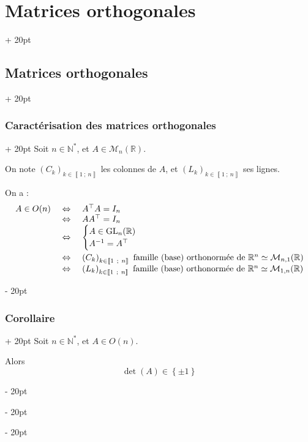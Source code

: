 \documentclass[a4paper, 12pt, twoside]{article}
\newcommand{\N}{\mathbb{N}} %
\newcommand{\R}{\mathbb{R}} %
\newcommand{\nset}[2]{\left\llbracket #1\ ;\ #2 \right\rrbracket}
\newcommand{\lr}[1]{\left( #1 \right)}
\newcommand{\set}[1]{\left\{ #1 \right\}}
\newcommand{\ssi}{\ \Leftrightarrow \ }
\newcommand{\ind}[1][20pt]{\advance\leftskip + #1}
\newcommand{\deind}[1][20pt]{\advance\leftskip - #1}
\newenvironment{indt}[2][20pt]{#2 \par \ind[#1]}{\par \deind} %
\begin{document}
\begin{indt}{\section{Matrices orthogonales}}
\begin{indt}{\subsection{Matrices orthogonales}}
            \begin{indt}{\subsubsection{Caractérisation des matrices orthogonales}}
                Soit $n \in \N^*$, et $A \in \mathcal M_n(\R)$.

                On note $\lr{C_k}_{k \in \nset 1 n}$ les colonnes de $A$, et $\lr{L_k}_{k \in \nset 1 n}$ ses lignes.

                On a :
                \[
                    \begin{array}{rcl}
                        A \in O(n)
                        &\ssi&
                        A^\top A = I_n
                        \\
                        &\ssi& A A^\top = I_n
                        \\
                        &\ssi&
                        \begin{cases}
                            A \in \mathrm{GL}_n(\R)
                            \\
                            A^{-1} = A^\top
                        \end{cases}
                        \vspace{3pt}
                        \\
                        &\ssi&
                        \lr{C_k}_{k \in \nset 1 n}\ \text{famille (base) orthonormée de}\ \R^n \simeq \mathcal M_{n, 1}(\R)
                        \\
                        &\ssi&
                        \lr{L_k}_{k \in \nset 1 n}\ \text{famille (base) orthonormée de}\ \R^n \simeq \mathcal M_{1, n}(\R)
                    \end{array}
                \]
            \end{indt}

            \vspace{12pt}
            
            \begin{indt}{\subsubsection{Corollaire}}
                Soit $n \in \N^*$, et $A \in O(n)$.

                Alors
                \[
                    \det(A) \in \set{\pm 1}
                \]
            \end{indt}


\end{indt}
\end{indt}
\end{document}

